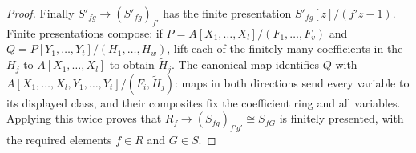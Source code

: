 \begin{proof}
\medskip\noindent
Finally $S'_{fg}\to(S'_{fg})_{f'}$ has the finite presentation
$S'_{fg}[z]/(f'z-1)$. Finite presentations compose: if
$P=A[X_1,\ldots,X_l]/(F_1,\ldots,F_v)$ and
$Q=P[Y_1,\ldots,Y_t]/(H_1,\ldots,H_w)$, lift each of the finitely
many coefficients in the $H_j$ to $A[X_1,\ldots,X_l]$ to obtain
$\widetilde H_j$. The canonical map identifies
$Q$ with $A[X_1,\ldots,X_l,Y_1,\ldots,Y_t]/(F_i,\widetilde H_j)$:
maps in both directions send every variable to its displayed class,
and their composites fix the coefficient ring and all variables.
Applying this twice proves that
$R_f\to(S_{fg})_{f'g'}\cong S_{fG}$ is finitely presented, with
the required elements $f\in R$ and $G\in S$.
\end{proof}